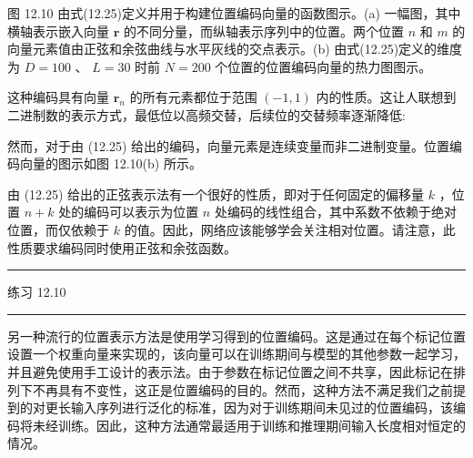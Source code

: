 \documentclass[10pt]{report}
\newcommand{\HRule}{\begin{center}\rule{0.9\linewidth}{0.2mm}\end{center}}
\begin{document}
图 12.10 由式(12.25)定义并用于构建位置编码向量的函数图示。(a) 一幅图，其中横轴表示嵌入向量 \(\mathbf{r}\) 的不同分量，而纵轴表示序列中的位置。两个位置 \(n\) 和 \(m\) 的向量元素值由正弦和余弦曲线与水平灰线的交点表示。(b) 由式(12.25)定义的维度为 \(D = {100}\) 、 \(L = {30}\) 时前 \(N = {200}\) 个位置的位置编码向量的热力图图示。

这种编码具有向量 \({\mathbf{r}}_{n}\) 的所有元素都位于范围 \(\left( {-1,1}\right)\) 内的性质。这让人联想到二进制数的表示方式，最低位以高频交替，后续位的交替频率逐渐降低:

\begin{center}
\end{center}

然而，对于由 (12.25) 给出的编码，向量元素是连续变量而非二进制变量。位置编码向量的图示如图 12.10(b) 所示。

由 (12.25) 给出的正弦表示法有一个很好的性质，即对于任何固定的偏移量 \(k\) ，位置 \(n + k\) 处的编码可以表示为位置 \(n\) 处编码的线性组合，其中系数不依赖于绝对位置，而仅依赖于 \(k\) 的值。因此，网络应该能够学会关注相对位置。请注意，此性质要求编码同时使用正弦和余弦函数。

\HRule

练习 12.10

\HRule

另一种流行的位置表示方法是使用学习得到的位置编码。这是通过在每个标记位置设置一个权重向量来实现的，该向量可以在训练期间与模型的其他参数一起学习，并且避免使用手工设计的表示法。由于参数在标记位置之间不共享，因此标记在排列下不再具有不变性，这正是位置编码的目的。然而，这种方法不满足我们之前提到的对更长输入序列进行泛化的标准，因为对于训练期间未见过的位置编码，该编码将未经训练。因此，这种方法通常最适用于训练和推理期间输入长度相对恒定的情况。
\end{document}
